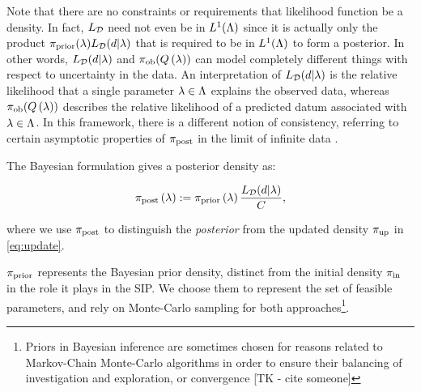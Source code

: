 Note that there are no constraints or requirements that likelihood function be a density.
In fact, $L_{\mathcal{D}}$ need not even be in $L^1({\Lambda})$ since it is actually only the product $\operatorname*{\pi_{prior}}(\lambda) L_{\mathcal{D}} (d | \lambda)$ that is required to be in $L^1({\Lambda})$ to form a posterior.
In other words, $L_{\mathcal{D}} (d | \lambda)$ and $\operatorname*{\pi_{ob}}(Q\left ( \lambda \right ))$ can model completely different things with respect to uncertainty in the data.
An interpretation of $L_{\mathcal{D}} (d | \lambda)$ is the relative likelihood that a single parameter $\lambda\in{\Lambda}$ explains the observed data, whereas $\operatorname*{\pi_{ob}}(Q\left ( \lambda \right ))$ describes the relative likelihood of a predicted datum associated with $\lambda\in{\Lambda}$.
In this framework, there is a different notion of consistency, referring to certain asymptotic properties of $\operatorname*{\pi_{post}}$ in the limit of infinite data \cite{Barron, Silverman}.




The Bayesian formulation gives a posterior density as:

\begin{equation}\label{eq:sb_post}
    \operatorname*{\pi_{post}}\left ( \lambda \right ) := \operatorname*{\pi_{prior}}\left ( \lambda \right ) \frac{L_{\mathcal{D}} (d | \lambda)}{ C },
\end{equation}

where we use $\operatorname*{\pi_{post}}$ to distinguish the \emph{posterior} from the updated density $\operatorname*{\pi_{up}}$ in \eqref{eq:update}.

$\operatorname*{\pi_{prior}}$ represents the Bayesian prior density, distinct from the initial density $\operatorname*{\pi_{in}}$ in the role it plays in the SIP.
We choose them to represent the set of feasible parameters, and rely on Monte-Carlo sampling for both approaches\footnote{Priors in Bayesian inference are sometimes chosen for reasons related to Markov-Chain Monte-Carlo algorithms in order to ensure their balancing of investigation and exploration, or convergence [TK - cite someone]}.
